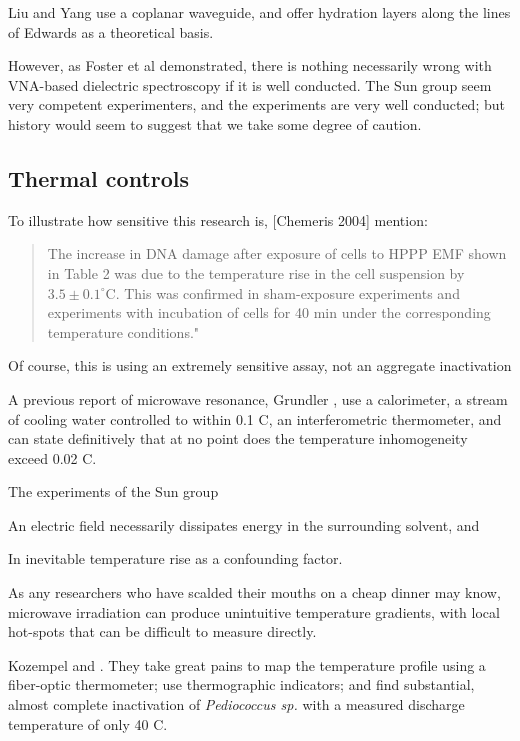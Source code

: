 \documentclass[paper.tex]{subfiles}
\begin{document}
Liu and Yang use a coplanar waveguide, and offer hydration layers along the lines of Edwards as a theoretical basis.




However, as Foster et al demonstrated, there is nothing necessarily wrong with VNA-based dielectric spectroscopy if it is well conducted. The Sun group seem very competent experimenters, and the experiments are very well conducted; but history would seem to suggest that we take some degree of caution.




\subsection{Thermal controls}

To illustrate how sensitive this research is, [Chemeris 2004] mention:

\begin{quote}
	
	The increase in DNA damage after exposure of cells to HPPP EMF shown in Table 2 was due to the temperature rise in the cell suspension by $3.5\pm0.1^{\circ}  $C. This was confirmed in sham-exposure experiments and experiments with incubation of cells for 40 min under the corresponding temperature conditions."
	
\end{quote}

Of course, this is using an extremely sensitive assay, not an aggregate inactivation 

A previous report of microwave resonance, Grundler \cite{Sharp1983}, use a calorimeter, a stream of cooling water controlled to within 0.1 C, an interferometric thermometer, and can state definitively that at no point does the temperature inhomogeneity exceed 0.02 C.

The experiments of the Sun group 

An electric field necessarily dissipates energy in the surrounding solvent, and 

In inevitable temperature rise as a confounding factor. 

As any researchers who have scalded their mouths on a cheap dinner may know, microwave irradiation can produce unintuitive temperature gradients, with local hot-spots that can be difficult to measure directly.

Kozempel \cite{Preliminary1997} and \cite{Inactivationa}. They take great pains to map the temperature profile using a fiber-optic thermometer; use thermographic indicators; and find substantial, almost complete inactivation of {\it Pediococcus sp.} with a measured discharge temperature of only 40 C.
\end{document}
